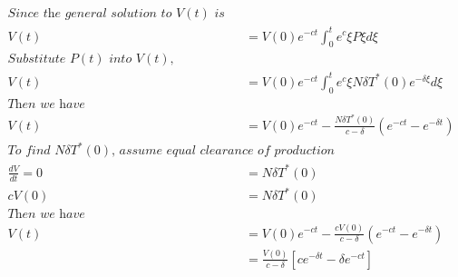 \documentclass{article}
\begin{document}
\begin{enumerate}
\begin{align*}
		\textit{Since the general solution to $V(t)$ is } \\
		V(t) &= V(0)e^{-ct}\int_{0}^{t}e^c{\xi}P{\xi}d\xi \\
		\textit{Substitute $P(t)$ into $V(t)$, }\\
		V(t) &= V(0)e^{-ct}\int_{0}^{t}e^c{\xi}N\delta T^{*}(0)e^{-\delta \xi}d\xi \\
		\textit{Then we have} \\
		V(t) &= V(0)e^{-ct} - \frac{N\delta T^{*}(0)}{c - \delta}(e^{-ct} - e^{-\delta t}) \\
		\textit{To find $N\delta T^{*}(0)$, assume equal clearance of production} \\
		\frac{dV}{dt} = 0 &= N\delta T^{*}(0) \\
		cV(0) &= N\delta T^{*}(0) \\
		\textit{Then we have} \\
		V(t) &= V(0)e^{-ct} - \frac{cV(0)}{c - \delta} (e^{-ct} - e^{-\delta t}) \\
			   &= \frac{V(0)}{c - \delta} [ce^{-\delta t} - \delta e^{-ct}]
	\end{align*}
	

\end{enumerate}
\end{document}
